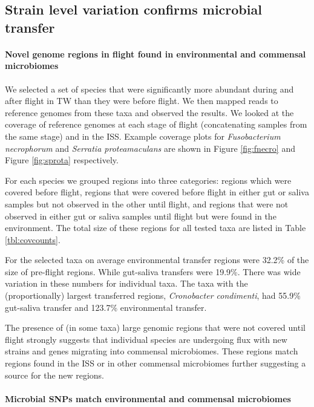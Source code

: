 \subsection{Strain level variation confirms microbial transfer}



\paragraph{Novel genome regions in flight found in environmental and commensal microbiomes}

We selected a set of species that were significantly more abundant during and after flight in TW than they were before flight. We then mapped reads to reference genomes from these taxa and observed the results. We looked at the coverage of reference genomes at each stage of flight (concatenating samples from the same stage) and in the ISS.  Example coverage plots for \textit{Fusobacterium necrophorum}  and \textit{Serratia proteamaculans} are shown in Figure \ref{fig:fnecro} and Figure \ref{fig:sprota} respectively.

For each species we grouped regions into three categories: regions which were covered before flight, regions that were covered before flight in either gut or saliva samples but not observed in the other until flight, and regions that were not observed in either gut or saliva samples until flight but were found in the environment. The total size of these regions for all tested taxa are listed in  Table \ref{tbl:covcounts}.

For the selected taxa on average environmental transfer regions were 32.2\% of the size of pre-flight regions. While gut-saliva transfers were 19.9\%. There was wide variation in these numbers for individual taxa. The taxa with the (proportionally) largest transferred regions, \textit{Cronobacter condimenti}, had 55.9\% gut-saliva transfer and 123.7\% environmental transfer. 

The presence of (in some taxa) large genomic regions that were not covered until flight strongly suggests that individual species are undergoing flux with new strains and genes migrating into commensal microbiomes. These regions match regions found in the ISS or in other commensal microbiomes further suggesting a source for the new regions.


\paragraph{Microbial SNPs match environmental and commensal microbiomes}



